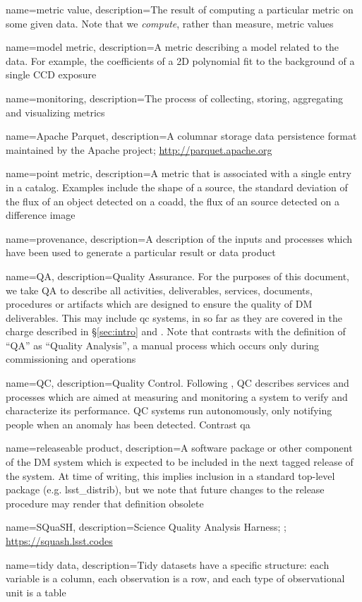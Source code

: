 {
  name={metric value},
  description={The result of computing a particular \gls{metric} on some given
  data. Note that we \textit{compute}, rather than measure, metric values}
}

{
  name={model metric},
  description={A \gls{metric} describing a model related to the data. For
  example, the coefficients of a 2D polynomial fit to the background of a
  single CCD exposure}
}

{
  name={monitoring},
  description={The process of collecting, storing, aggregating and visualizing
  metrics}
}

{
  name={Apache Parquet},
  description={A columnar storage data persistence format maintained by the
  Apache project; \url{http://parquet.apache.org}}
}

{
  name={point metric},
  description={A \gls{metric} that is associated with a single entry in a
  catalog. Examples include the shape of a source, the standard deviation of
  the flux of an object detected on a coadd, the flux of an source detected on
  a difference image}
}

{
  name={provenance},
  description={A description of the inputs and processes which have been used
  to generate a particular result or data product}
}

{
  name={QA},
  description={Quality Assurance. For the purposes of this document, we take
  QA to describe all activities, deliverables, services, documents, procedures
  or artifacts which are designed to ensure the quality of DM deliverables.
  This may include \gls{qc} systems, in so far as they are covered in the
  charge described in \S\ref{sec:intro} and . Note that
  contrasts with the  definition of ``QA'' as ``Quality
  Analysis'', a manual process which occurs only during commissioning and
  operations}
}

{
  name={QC},
  description={Quality Control. Following , QC describes
  services and processes which are aimed at measuring and monitoring a system
  to verify and characterize its performance. QC systems run autonomously,
  only notifying people when an anomaly has been detected. Contrast \gls{qa}}
}

{
  name={releaseable product},
  description={A software package or other component of the DM system which
  is expected to be included in the next tagged release of the system. At time
  of writing, this implies inclusion in a standard top-level package
  (e.g. lsst\_distrib), but we note that future changes to the release procedure
  may render that definition obsolete}
}

{
  name={SQuaSH},
  description={Science Quality Analysis Harness; ;
  \url{https://squash.lsst.codes}}
}

{
  name={tidy data},
  description={Tidy datasets have a specific structure: each variable is a
  column, each observation is a row, and each type of observational unit is a
  table \citep{JSSv059i10}}
}
